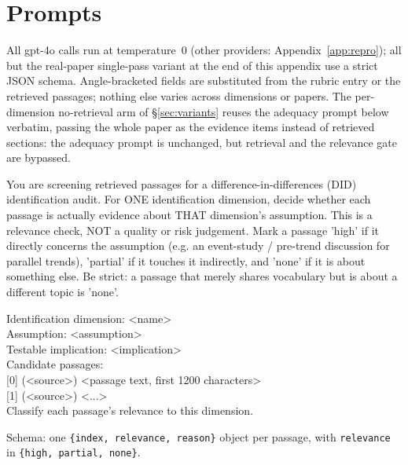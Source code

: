 \section{Prompts}
\label{app:prompts}
All gpt-4o calls run at temperature~$0$ (other providers:
Appendix~\ref{app:repro}); all but the real-paper single-pass
variant at the end of this appendix use a strict JSON schema. Angle-bracketed
fields are substituted from the rubric entry or the retrieved passages; nothing
else varies across dimensions or papers. The per-dimension no-retrieval arm of
\S\ref{sec:variants} reuses the adequacy prompt below verbatim, passing the whole
paper as the evidence items instead of retrieved sections: the adequacy prompt
is unchanged, but retrieval and the relevance gate are bypassed.

\begin{promptbox}
You are screening retrieved passages for a difference-in-differences (DID)
identification audit. For ONE identification dimension, decide whether each
passage is actually evidence about THAT dimension's assumption. This is a
relevance check, NOT a quality or risk judgement. Mark a passage 'high' if it
directly concerns the assumption (e.g. an event-study / pre-trend discussion for
parallel trends), 'partial' if it touches it indirectly, and 'none' if it is
about something else. Be strict: a passage that merely shares vocabulary but is
about a different topic is 'none'.
\end{promptbox}

\begin{promptbox}
Identification dimension: <name>\\
Assumption: <assumption>\\
Testable implication: <implication>\\[5pt]
Candidate passages:\\
{}[0] (<source>) <passage text, first 1200 characters>\\
{}[1] (<source>) <...>\\[5pt]
Classify each passage's relevance to this dimension.
\end{promptbox}
\begin{sloppypar}\noindent Schema: one \texttt{\{index, relevance, reason\}}
object per passage, with \texttt{relevance} in
\texttt{\{high, partial, none\}}.\end{sloppypar}

